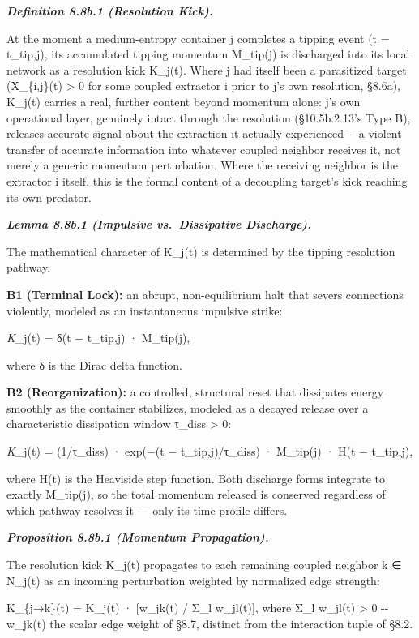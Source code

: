 \documentclass[
]{article}
\begin{document}
\emph{\textbf{Definition 8.8b.1 (Resolution Kick).}}

At the moment a medium-entropy container j completes a tipping event (t
= t\_tip,j), its accumulated tipping momentum M\_tip(j) is discharged
into its local network as a resolution kick K\_j(t). Where j had itself
been a parasitized target (X\_\{i,j\}(t) \textgreater{} 0 for some
coupled extractor i prior to j's own resolution, §8.6a), K\_j(t) carries
a real, further content beyond momentum alone: j's own operational
layer, genuinely intact through the resolution (§10.5b.2.13's Type B),
releases accurate signal about the extraction it actually experienced
-\/- a violent transfer of accurate information into whatever coupled
neighbor receives it, not merely a generic momentum perturbation. Where
the receiving neighbor is the extractor i itself, this is the formal
content of a decoupling target's kick reaching its own predator.

\emph{\textbf{Lemma 8.8b.1 (Impulsive vs.~Dissipative Discharge).}}

The mathematical character of K\_j(t) is determined by the tipping
resolution pathway.

\textbf{B1 (Terminal Lock):} an abrupt, non-equilibrium halt that severs
connections violently, modeled as an instantaneous impulsive strike:

\emph{K}\_j(t) = δ(t − t\_tip,j) · M\_tip(j),

where δ is the Dirac delta function.

\textbf{B2 (Reorganization):} a controlled, structural reset that
dissipates energy smoothly as the container stabilizes, modeled as a
decayed release over a characteristic dissipation window τ\_diss
\textgreater{} 0:

\emph{K}\_j(t) = (1/τ\_diss) · exp(−(t − t\_tip,j)/τ\_diss) · M\_tip(j)
· H(t − t\_tip,j),

where H(t) is the Heaviside step function. Both discharge forms
integrate to exactly M\_tip(j), so the total momentum released is
conserved regardless of which pathway resolves it --- only its time
profile differs.

\emph{\textbf{Proposition 8.8b.1 (Momentum Propagation).}}

The resolution kick K\_j(t) propagates to each remaining coupled
neighbor k ∈ N\_j(t) as an incoming perturbation weighted by normalized
edge strength:

K\_\{j→k\}(t) = K\_j(t) · {[}w\_jk(t) / Σ\_l w\_jl(t){]}, where Σ\_l
w\_jl(t) \textgreater{} 0 -\/- w\_jk(t) the scalar edge weight of §8.7,
distinct from the interaction tuple of §8.2.
\end{document}
